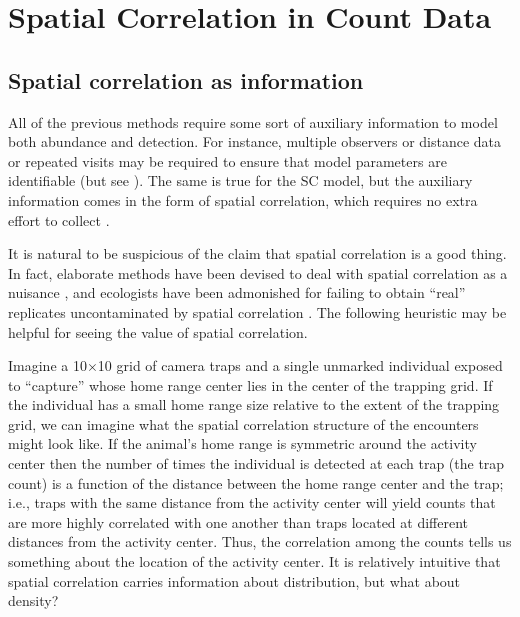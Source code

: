 \section{Spatial Correlation in Count Data}

\subsection{Spatial correlation as information}
\label{sect.corr-info}

All of the previous methods require some sort of auxiliary information
to model both abundance and detection. For instance, %
multiple observers or distance data or repeated visits
may be required
to ensure
that model parameters are identifiable (but see
  \citep{lele_etal:2012, solymos_etal:2012}). The same is true for
the SC model, but the auxiliary information comes in the form of spatial
correlation, which requires no extra effort to collect
\citep{chandler_royle:2012}. %

It is natural to be suspicious of the claim that spatial correlation
is a good thing. In fact, elaborate methods have been devised to deal
with spatial correlation as a nuisance %
\citep{lichstein_etal:2002,dormann_etal:2007}, and ecologists have been admonished for
failing to obtain ``real'' replicates uncontaminated by spatial
correlation \citep{hurlbert:1984}. The following heuristic may be
helpful for seeing the value of spatial correlation.

Imagine a 10$\times$10 grid of camera traps and a single unmarked
individual exposed to ``capture'' whose home range center lies in the center of the
trapping grid. If the individual has a small home range size relative
to the extent of the trapping grid, we can imagine what the
spatial correlation structure of the encounters might look
like. If the animal's home range is symmetric around the activity center
then the number of times the individual is detected at each
trap (the trap count) is a function of the distance between the home
range center and the trap; i.e., traps with the same distance
from the activity center will yield counts that are more highly
correlated with one another than traps located at different distances
from the activity center. Thus, the correlation among the counts tells us
something about the location of the activity center. It is relatively
intuitive that spatial correlation carries information about
distribution, but what about density?


